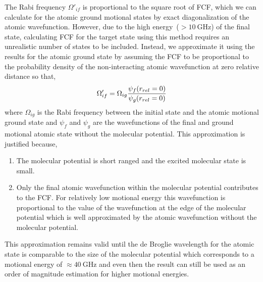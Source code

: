 The Rabi frequency $\Omega'_{if}$ is proportional to the square root of FCF,
which we can calculate for the atomic ground motional states by exact diagonalization
of the atomic wavefunction.
However, due to the high energy~($>\!10~\mathrm{GHz}$) of the final state,
calculating FCF for the target state using this method requires an unrealistic number of
states to be included.
Instead, we approximate it using the results for the atomic ground state
by assuming the FCF to be proportional to the probability density of the non-interacting
atomic wavefunction at zero relative distance so that,
\[
  \Omega'_{if}=\Omega_{ig}\frac{\psi_f{\left({r_{rel}=0}\right)}}{\psi_g{\left({r_{rel}=0}\right)}}
\]
where $\Omega_{ig}$ is the Rabi frequency between the initial state and
the atomic motional ground state and $\psi_f$ and $\psi_g$ are the
wavefunctions of the final and ground motional atomic state without the molecular potential.
This approximation is justified because,
\begin{enumerate}
\item The molecular potential is short ranged and the excited molecular state is small.
\item Only the final atomic wavefunction within the molecular potential contributes to the FCF.
  For relatively low motional energy
  this wavefunction is proportional to the value of the wavefunction at
  the edge of the molecular potential which is well approximated by
  the atomic wavefunction without the molecular potential.
\end{enumerate}
This approximation remains valid until the de Broglie wavelength for the atomic state
is comparable to the size of the molecular potential which corresponds to
a motional energy of $\approx\!40~\mathrm{GHz}$
and even then the result can still be used as an order of magnitude estimation
for higher motional energies.

